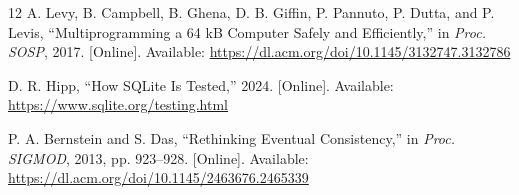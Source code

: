 \documentclass[conference,a4paper]{IEEEtran}
\begin{document}
\begin{thebibliography}{12}
A. Levy, B. Campbell, B. Ghena, D. B. Giffin, P. Pannuto, P. Dutta, and P. Levis, ``Multiprogramming a 64 kB Computer Safely and Efficiently,'' in \textit{Proc. SOSP}, 2017. [Online]. Available: \url{https://dl.acm.org/doi/10.1145/3132747.3132786}

D. R. Hipp, ``How SQLite Is Tested,'' 2024. [Online]. Available: \url{https://www.sqlite.org/testing.html}

P. A. Bernstein and S. Das, ``Rethinking Eventual Consistency,'' in \textit{Proc. SIGMOD}, 2013, pp. 923--928. [Online]. Available: \url{https://dl.acm.org/doi/10.1145/2463676.2465339}

\end{thebibliography}
\end{document}
